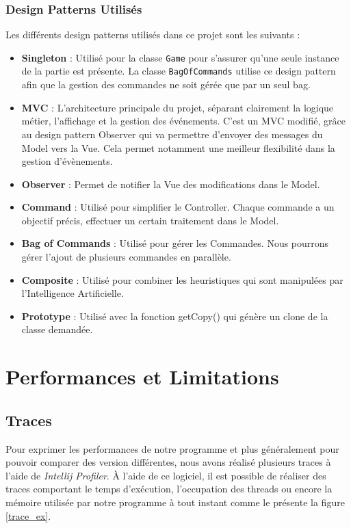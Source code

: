 \documentclass{article}
\begin{document}
\subsubsection{Design Patterns Utilisés}

Les différents design patterns utilisés dans ce projet sont les suivants : 
\begin{itemize}
    \item \textbf{Singleton} : Utilisé pour la classe \texttt{Game} pour s'assurer qu'une seule instance de la partie est présente.
    La classe \texttt{BagOfCommands} utilise ce design pattern afin que la gestion des commandes ne soit gérée que par un seul bag.
    \item \textbf{MVC} : L'architecture principale du projet, séparant clairement la logique métier, l'affichage et la gestion des événements. C'est un MVC modifié,
 grâce au design pattern Observer qui va permettre d'envoyer des messages du Model vers la Vue. Cela permet notamment une meilleur flexibilité dans la
 gestion d'évènements.
    \item \textbf{Observer} : Permet de notifier la Vue des modifications dans le Model.
    \item \textbf{Command} : Utilisé pour simplifier le Controller. Chaque commande a un objectif précis, effectuer un certain traitement dans le Model.
    \item \textbf{Bag of Commands} : Utilisé pour gérer les Commandes. Nous pourrons gérer l'ajout de plusieurs commandes en parallèle.
    \item \textbf{Composite} : Utilisé pour combiner les heuristiques qui sont manipulées par l'Intelligence Artificielle.
    \item \textbf{Prototype} : Utilisé avec la fonction getCopy() qui génère un clone de la classe demandée.
\end{itemize}


\section{Performances et Limitations}
\subsection{Traces}
Pour exprimer les performances de notre programme et plus généralement pour pouvoir comparer des version différentes, nous avons réalisé plusieurs
traces à l'aide de \textit{Intellij Profiler}. À l'aide de ce logiciel, il est possible de réaliser des traces comportant le temps d'exécution, l'occupation des threads
ou encore la mémoire utilisée par notre programme à tout instant comme le présente la figure \ref{trace_ex}.
\end{document}
